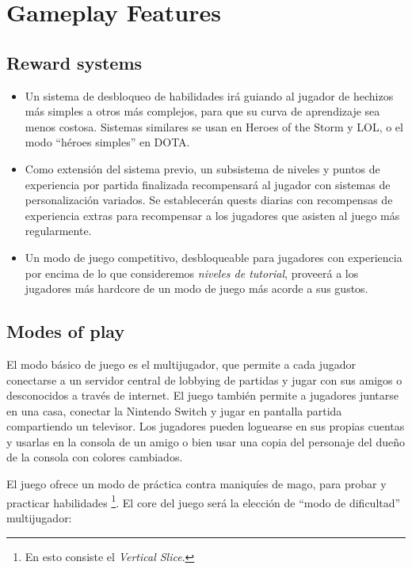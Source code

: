 \documentclass[12pt]{report}
\begin{document}
\newpage

\section{Gameplay Features}     

\subsection{Reward systems}

\begin{itemize}
\item Un sistema de desbloqueo de habilidades irá guiando al jugador de hechizos más simples a otros más complejos, para que su curva de aprendizaje sea menos costosa. Sistemas similares se usan en Heroes of the Storm y LOL, o el modo ``héroes simples'' en DOTA.
\item Como extensión del sistema previo, un subsistema de niveles y puntos de experiencia por partida finalizada recompensará al jugador con sistemas de personalización variados. Se establecerán quests diarias con recompensas de experiencia extras para recompensar a los jugadores que asisten al juego más regularmente.
\item Un modo de juego competitivo, desbloqueable para jugadores con experiencia por encima de lo que consideremos \textit{niveles de tutorial}, proveerá a los jugadores más hardcore de un modo de juego más acorde a sus gustos.
\end{itemize}     

\subsection{Modes of play}

El modo básico de juego es el multijugador, que permite a cada jugador conectarse a un servidor central de lobbying de partidas y jugar con sus amigos o desconocidos a través de internet. El juego también permite a jugadores juntarse en una casa, conectar la Nintendo Switch y jugar en pantalla partida compartiendo un televisor. Los jugadores pueden loguearse en sus propias cuentas y usarlas en la consola de un amigo o bien usar una copia del personaje del dueño de la consola con colores cambiados.

El juego ofrece un modo de práctica contra maniquíes de mago, para probar y practicar habilidades \footnote{En esto consiste el \textit{Vertical Slice}.}. El core del juego será la elección de ``modo de dificultad'' multijugador:
\end{document}
